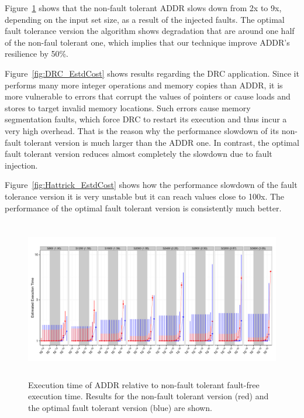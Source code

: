 \documentclass{sig-alternate}
\begin{document}
Figure~\ref{fig:Lasso_EstdCost} shows that the non-fault tolerant ADDR slows down from 2x to 9x, depending on the input set size, as a result of the injected faults.
The optimal fault tolerance version the algorithm shows degradation that are around one half of the non-faul tolerant one, which implies that our technique improve ADDR's resilience by 50\%.

Figure~\ref{fig:DRC_EstdCost} shows results regarding the DRC application.
Since it performs many more integer operations and memory copies than ADDR, it is more vulnerable to errors that corrupt the values of pointers or cause loads and stores to target invalid memory locations.
Such errors cause memory segmentation faults, which force DRC to restart its execution and thus incur a very high overhead.
That is the reason why the performance slowdown of its non-fault tolerant version is much larger than the ADDR one.
In contrast, the optimal fault tolerant version reduces almost completely the slowdown due to fault injection.

Figure~\ref{fig:Hattrick_EstdCost} shows how the performance slowdown of the fault tolerance version it is very unstable but it can reach values close to 100x.
The performance of the optimal fault tolerant version is consistently much better.

\begin{figure}[ht!]
\centering
\includegraphics[height=2.75in]{figs/Lasso_EstdCost.png}
\vspace{-10pt}
\caption{Execution time of ADDR relative to non-fault tolerant fault-free execution time. Results for the non-fault tolerant version (red) and the optimal fault tolerant version (blue) are shown.}
\vspace{-10pt}
\label{fig:Lasso_EstdCost}
\end{figure}
\end{document}
